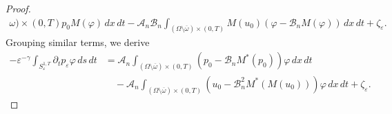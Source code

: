 \documentclass[10pt,a4paper]{amsart}
\numberwithin{equation}{section}
\begin{document}
\begin{proof}
\begin{align*}
{{\omega })\times (0,T)}p_0M(\varphi )\,dx\,dt-\mathcal{A}_n\mathcal{B}%
_n\int _{(\Omega \setminus \overline{\omega })\times
(0,T)}M(u_0)(\varphi -\mathcal{B}_nM(\varphi ))\,dx\,dt+\zeta
_{\varepsilon }.
\end{align*}
Grouping similar terms, we derive
\begin{equation}
\begin{aligned}
-\varepsilon ^{-\gamma }\int _{S_{\varepsilon }^{1,T}}\partial
_{t}p_{\varepsilon }\varphi \,ds\,dt
&=\mathcal{A}_n\int _{(\Omega
\setminus \overline{\omega })\times (0,T)}(p_0-\mathcal{B}_nM^{\ast
}(p_0))\varphi \,dx\,dt    \\
&\quad -\mathcal{A}_n\int _{(\Omega \setminus \overline{\omega })\times
(0,T)}(u_0-\mathcal{B}_n^2M^{\ast }(M(u_0)))\varphi \,dx\,dt+\zeta
_{\varepsilon }.
\end{aligned}  \label{pa_t p uncont}
\end{equation}


\end{proof}
\end{document}

